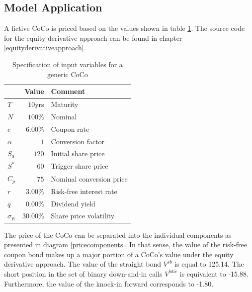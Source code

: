 \subsection{Model Application}
A fictive CoCo is priced based on the values shown in table \ref{equityexample}. The source code for the equity derivative approach can be found in chapter \ref{equityderivativeapproach}. 
\begin{table}[H]
	\setlength{\extrarowheight}{2.5pt}
	\centering
	\begin{tabular}{lrl}
		\toprule
			 & \textbf{Value} & \textbf{Comment} \\
		\midrule
			$T$ & $10$yrs & Maturity \\
			$N$ & $100\%$ & Nominal \\			
			$c$ & $6.00\%$ & Coupon rate \\
			$\alpha$ & $1$ & Conversion factor \\ 
			$S_0$ & $120$ & Initial share price \\
			$S^*$ & $60$ & Trigger share price \\
			$C_p$ & $75$ & Nominal conversion price \\
			$r$ & $3.00\%$ & Risk-free interest rate\\
			$q$ & $0.00\%$ & Dividend yield \\
			$\sigma_E$& $30.00\%$ & Share price volatility \\
		\bottomrule
	\end{tabular}
	\caption[Specification of input variables for a generic CoCo under the equity derivative approach]{Specification of input variables for a generic CoCo}
	\label{equityexample}
\end{table}
The price of the CoCo can be separated into the individual components as presented in diagram \ref{pricecomponents}. In that sense, the value of the risk-free coupon bond makes up a major portion of a CoCo's value under the equity derivative approach. The value of the straight bond $V^{sb}$ is equal to 125.14. The short position in the set of binary down-and-in calls $V^{bdic}$ is equivalent to -15.88. Furthermore, the value of the knock-in forward corresponds to -1.80.

